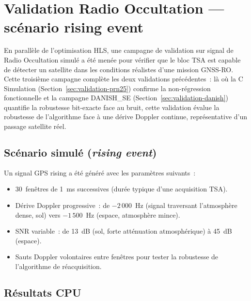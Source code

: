 \documentclass[11pt,a4paper]{article}
\begin{document}
\section{Validation Radio Occultation --- scénario rising event}
\label{sec:validation-ro}

En parallèle de l'optimisation HLS, une campagne de validation sur signal de Radio Occultation simulé a été menée pour vérifier que le bloc TSA est capable de détecter un satellite dans les conditions réalistes d'une mission GNSS-RO. Cette troisième campagne complète les deux validations précédentes~: là où la C Simulation (Section~\ref{sec:validation-prn25}) confirme la non-régression fonctionnelle et la campagne DANISH\_SE (Section~\ref{sec:validation-danish}) quantifie la robustesse bit-exacte face au bruit, cette validation évalue la robustesse de l'algorithme face à une dérive Doppler continue, représentative d'un passage satellite réel.

\subsection{Scénario simulé (\textit{rising event})}

Un signal GPS rising a été généré avec les paramètres suivants~:
\begin{itemize}
  \item 30~fenêtres de 1~ms successives (durée typique d'une acquisition TSA).
  \item Dérive Doppler progressive~: de $-2\,000$~Hz (signal traversant l'atmosphère dense, sol) vers $-1\,500$~Hz (espace, atmosphère mince).
  \item SNR variable~: de 13~dB (sol, forte atténuation atmosphérique) à 45~dB (espace).
  \item Sauts Doppler volontaires entre fenêtres pour tester la robustesse de l'algorithme de réacquisition.
\end{itemize}

\subsection{Résultats CPU}
\end{document}
